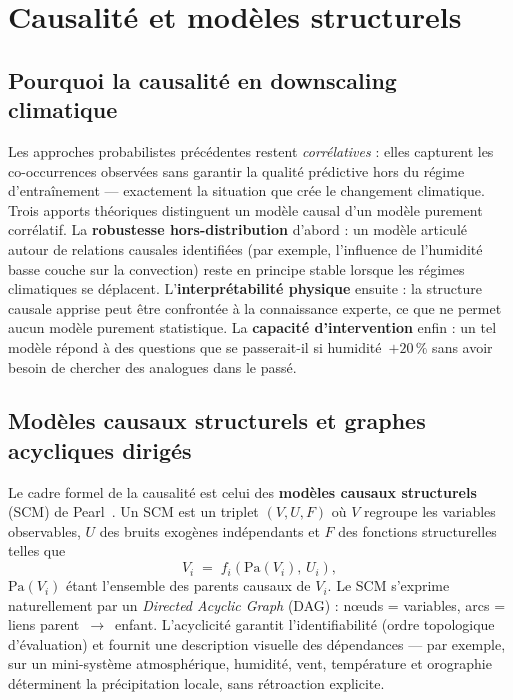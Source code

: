 \documentclass[14pt,a4paper,openany]{extreport}
\begin{document}
\section{Causalité et modèles structurels}
\label{sec:causalite}

\subsection{Pourquoi la causalité en downscaling climatique}
\label{ssec:why-causal}

Les approches probabilistes précédentes restent \emph{corrélatives} : elles capturent les co-occurrences observées sans garantir la qualité prédictive hors du régime d'entraînement --- exactement la situation que crée le changement climatique. Trois apports théoriques distinguent un modèle causal d'un modèle purement corrélatif. La \textbf{robustesse hors-distribution} d'abord : un modèle articulé autour de relations causales identifiées (par exemple, l'influence de l'humidité basse couche sur la convection) reste en principe stable lorsque les régimes climatiques se déplacent. L'\textbf{interprétabilité physique} ensuite : la structure causale apprise peut être confrontée à la connaissance experte, ce que ne permet aucun modèle purement statistique. La \textbf{capacité d'intervention} enfin : un tel modèle répond à des questions \og que se passerait-il si humidité~$+20\,\%$ \fg{} sans avoir besoin de chercher des analogues dans le passé.

\subsection{Modèles causaux structurels et graphes acycliques dirigés}
\label{ssec:scm-dag}

Le cadre formel de la causalité est celui des \textbf{modèles causaux structurels} (SCM) de Pearl~\cite{pearl_causality_2009,pearl_book_of_why_2018}. Un SCM est un triplet $(V, U, F)$ où $V$ regroupe les variables observables, $U$ des bruits exogènes indépendants et $F$ des fonctions structurelles telles que
\begin{equation}
  V_i \;=\; f_i\!\left(\mathrm{Pa}(V_i),\, U_i\right),
  \label{eq:scm}
\end{equation}
$\mathrm{Pa}(V_i)$ étant l'ensemble des parents causaux de $V_i$. Le SCM s'exprime naturellement par un \emph{Directed Acyclic Graph} (DAG) : nœuds = variables, arcs = liens parent~$\to$~enfant. L'acyclicité garantit l'identifiabilité (ordre topologique d'évaluation) et fournit une description visuelle des dépendances --- par exemple, sur un mini-système atmosphérique, humidité, vent, température et orographie déterminent la précipitation locale, sans rétroaction explicite.
\label{fig:scm-dag}
\end{document}
